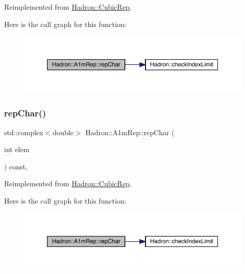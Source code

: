 Reimplemented from \mbox{\hyperlink{structHadron_1_1CubicRep_af45227106e8e715e84b0af69cd3b36f8}{Hadron\+::\+Cubic\+Rep}}.

Here is the call graph for this function\+:
\nopagebreak
\begin{figure}[H]
\begin{center}
\leavevmode
\includegraphics[width=350pt]{d3/dab/structHadron_1_1A1mRep_aae7d6e39a56f0cfd67cb66ad8e1f2f56_cgraph}
\end{center}
\end{figure}
\mbox{\label{structHadron_1_1A1mRep_aae7d6e39a56f0cfd67cb66ad8e1f2f56}} 
\subsubsection{\texorpdfstring{repChar()}{repChar()}\hspace{0.1cm}{\footnotesize\ttfamily [3/3]}}
{\footnotesize\ttfamily std\+::complex$<$double$>$ Hadron\+::\+A1m\+Rep\+::rep\+Char (\begin{DoxyParamCaption}\item[{int}]{elem }\end{DoxyParamCaption}) const\hspace{0.3cm}{\ttfamily [inline]}, {\ttfamily [virtual]}}



Reimplemented from \mbox{\hyperlink{structHadron_1_1CubicRep_af45227106e8e715e84b0af69cd3b36f8}{Hadron\+::\+Cubic\+Rep}}.

Here is the call graph for this function\+:
\nopagebreak
\begin{figure}[H]
\begin{center}
\leavevmode
\includegraphics[width=350pt]{d3/dab/structHadron_1_1A1mRep_aae7d6e39a56f0cfd67cb66ad8e1f2f56_cgraph}
\end{center}
\end{figure}
\mbox{\label{structHadron_1_1A1mRep_aa82be422dc6de780227bb8c42dfeab36}} 
